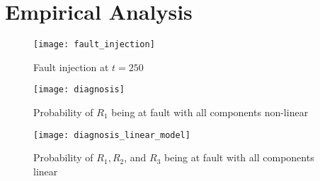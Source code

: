 \section{Empirical Analysis}
%
\begin{figure}[htb]
  \centering
  \texttt{[image: fault\_injection]}
  \caption{Fault injection at $t = 250$}
  \label{fig:fault_injection}
\end{figure}
%
\begin{figure}[htb]
  \centering
  \texttt{[image: diagnosis]}
  \caption{Probability of $R_1$ being at fault with all components non-linear}
  \label{fig:diagnosis}
\end{figure}
%
\begin{figure}[htb]
  \centering
  \texttt{[image: diagnosis\_linear\_model]}
  \caption{Probability of $R_1, R_2$, and $R_3$ being at fault with all components linear}
  \label{fig:diagnosis}
\end{figure}

